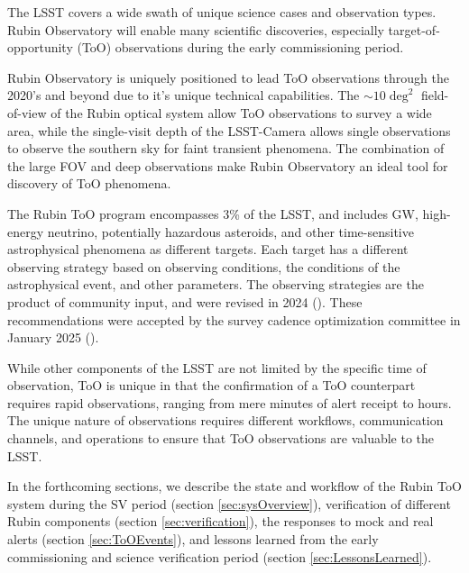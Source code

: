 The LSST covers a wide swath of unique science cases and observation types. Rubin Observatory will enable many scientific discoveries, especially target-of-opportunity (ToO) observations during the early commissioning period. 

Rubin Observatory is uniquely positioned to lead ToO observations through the 2020's and beyond due to it's unique technical capabilities. The $\sim10\deg^2$ field-of-view of the Rubin optical system allow ToO observations to survey a wide area, while the single-visit depth of the LSST-Camera allows single observations to observe the southern sky for faint transient phenomena. The combination of the large FOV and deep observations make Rubin Observatory an ideal tool for discovery of ToO phenomena.

The Rubin ToO program encompasses 3\% of the LSST, and includes GW, high-energy neutrino, potentially hazardous asteroids, and other time-sensitive astrophysical phenomena as different targets. Each target has a different observing strategy based on observing conditions, the conditions of the astrophysical event, and other parameters. The observing strategies are the product of community input, and were revised in 2024 (\cite{RubinToO2024}). These recommendations were accepted by the survey cadence optimization committee in January 2025 (\cite{PSTN-056}).

While other components of the LSST are not limited by the specific time of observation, ToO is unique in that the confirmation of a ToO counterpart requires rapid observations, ranging from mere minutes of alert receipt to hours. The unique nature of observations requires different workflows, communication channels, and operations to ensure that ToO observations are valuable to the LSST. 

In the forthcoming sections, we describe the state and workflow of the Rubin ToO system during the SV period (section \ref{sec:sysOverview}), verification of different Rubin components (section \ref{sec:verification}), the responses to mock and real alerts (section \ref{sec:ToOEvents}), and lessons learned from the early commissioning and science verification period (section \ref{sec:LessonsLearned}).